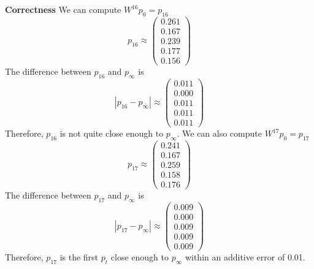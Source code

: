 \documentclass[12pt,twoside]{article}
\begin{document}
\begin{problems}
\begin{problemparts}
{\bf Correctness} We can compute $W^{16} p_0 = p_{16}$
$$ p_{16} \approx \begin{pmatrix}
  0.261 \\
  0.167 \\
  0.239 \\
  0.177 \\
  0.156
\end{pmatrix} $$
The difference between $p_{16}$ and $p_{\infty}$ is
$$ |p_{16} - p_{\infty}| \approx \begin{pmatrix}
  0.011 \\
  0.000 \\
  0.011 \\
  0.011 \\
  0.011
\end{pmatrix} $$
Therefore, $p_{16}$ is not quite close enough to $p_{\infty}$. We can also
compute $W^{17} p_0 = p_{17}$
$$ p_{17} \approx \begin{pmatrix}
  0.241 \\
  0.167 \\
  0.259 \\
  0.158 \\
  0.176
\end{pmatrix} $$
The difference between $p_{17}$ and $p_{\infty}$ is
$$ |p_{17} - p_{\infty}| \approx \begin{pmatrix}
  0.009 \\
  0.000 \\
  0.009 \\
  0.009 \\
  0.009
\end{pmatrix} $$
Therefore, $p_{17}$ is the first $p_t$ close enough to $p_{\infty}$ within an
additive error of 0.01.

\end{problemparts}

\end{problems}
\end{document}
